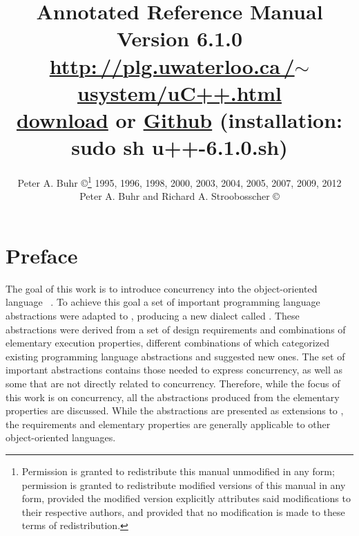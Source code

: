 \documentclass[openright,twoside]{report}
\newcommand{\Version}{6.1.0}
\begin{document}

\pagestyle{headings}

\title{\huge \bf
\uC Annotated Reference Manual \\
\vspace{1in}
\LARGE Version \Version \\
\vspace{1in}
\href{http://plg.uwaterloo.ca/~usystem/uC++.html}{\textsf{http:\,//\hspace{0.1ex}plg.uwaterloo.ca\,/$\sim$usystem/uC++.html}} \\
\vspace{0.125in}
\href{http://plg.uwaterloo.ca/~usystem/pub/uSystem/u++-6.1.0.sh}{\uC download} or \href{https://github.com/pabuhr/uCPP}{Github} (installation: \textsf{sudo sh u++-6.1.0.sh}) \\
} %
\author{
\Large Peter A. Buhr \copyright\thanks{\normalsize
Permission is granted to redistribute this manual unmodified in any form;
permission is granted to redistribute modified versions of this	manual in any form, provided the modified version explicitly attributes said modifications to their respective authors, and provided that no modification is made to these terms of redistribution.
} 1995, 1996, 1998, 2000, 2003, 2004, 2005, 2007, 2009, 2012 \\
\Large Peter A. Buhr and Richard A. Stroobosscher \copyright{} \\
} %

\maketitle
\thispagestyle{empty}			%
\cleardoublepage				%
\tableofcontents
\cleardoublepage				%


\chapter*{Preface}

The goal of this work is to introduce concurrency into the object-oriented language \CC~\cite{C++:V3}.
To achieve this goal a set of important programming language abstractions were adapted to \CC, producing a new dialect called \uC.
These abstractions were derived from a set of design requirements and combinations of elementary execution properties, different combinations of which categorized existing programming language abstractions and suggested new ones.
The set of important abstractions contains those needed to express concurrency, as well as some that are not directly related to concurrency.
Therefore, while the focus of this work is on concurrency, all the abstractions produced from the elementary properties are discussed.
While the abstractions are presented as extensions to \CC, the requirements and elementary properties are generally applicable to other object-oriented languages.
\end{document}
